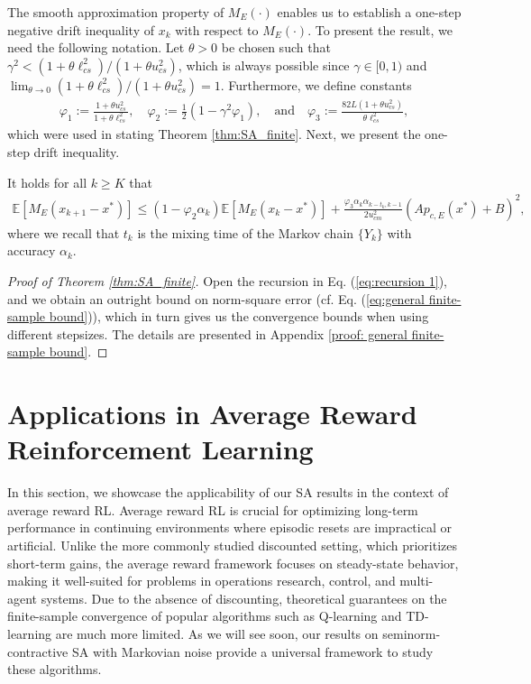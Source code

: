 \documentclass[11 pt]{article}
\begin{document}
	The smooth approximation property of $M_E(\cdot)$ enables us to establish a one-step negative drift inequality of $x_k$ with respect to $M_E(\cdot)$. To present the result, we need the following notation. Let $\theta > 0$ be chosen such that $\gamma^2 < (1+\theta \ell^2_{cs})/(1+\theta u^2_{cs})$, which is always possible since $\gamma \in [0,1)$ and $\lim_{\theta \rightarrow 0}(1+\theta \ell^2_{cs})/(1+\theta u^2_{cs})=1$. Furthermore, we define constants
	\begin{align}\label{eq:def:constants}
		\varphi_1:=\frac{1+\theta u_{cs}^2}{1+\theta \ell_{cs}^2},\quad  \varphi_2:=\frac{1}{2}\left(1-\gamma^2 \varphi_1 \right), \quad \text{and} \quad \varphi_3:=\frac{82L (1+\theta u_{cs}^2)}{\theta\ell_{cs}^2},
	\end{align}
	which were used in stating Theorem \ref{thm:SA_finite}.
	Next, we present the one-step drift inequality.
	\begin{proposition}\label{le:recursion}
		It holds  for all $k\geq K$ that
		\begin{align}\label{eq:recursion 1}
			\mathbb{E}\left[M_E(x_{k+1}-x^*)\right]\leq
			\left(1-\varphi_2 \alpha_k\right)\mathbb{E}[M_E(x_k-x^*)] +\frac{\varphi_3\alpha_k\alpha_{k-t_k,k-1}}{2u_{cm}^2}\left(Ap_{c,E}(x^*)+B\right)^2,
		\end{align}
		where we recall that $t_k$ is the mixing time of the Markov chain $\{Y_k\}$ with accuracy $\alpha_k$.
	\end{proposition}
	
	\begin{proof}[Proof of Theorem \ref{thm:SA_finite}]
		Open the recursion in Eq. (\ref{eq:recursion 1}), and we obtain an outright bound on norm-square error (cf. Eq. (\ref{eq:general finite-sample bound})), which in turn gives us the convergence bounds when using different stepsizes. The details are presented in Appendix \ref{proof: general finite-sample bound}.\end{proof}
	
	
	
	
	\section{Applications in Average Reward Reinforcement Learning}
	\label{sec:average-reward-RL}
	In this section, we showcase the applicability of our SA results in the context of average reward RL. Average reward RL is crucial for optimizing long-term performance in continuing environments where episodic resets are impractical or artificial. Unlike the more commonly studied discounted setting, which prioritizes short-term gains, the average reward framework focuses on steady-state behavior, making it well-suited for problems in operations research, control, and multi-agent systems. Due to the absence of discounting, theoretical guarantees on the finite-sample convergence of popular algorithms such as Q-learning and TD-learning are much more limited. As we will see soon, our results on seminorm-contractive SA with Markovian noise provide a universal framework to study these algorithms.
	
\end{document}
